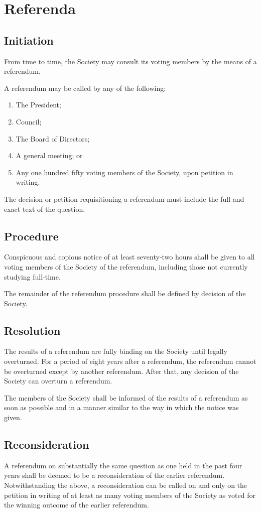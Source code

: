 \section{Referenda}
\subsection{Initiation}
From time to time, the Society may consult its voting members by the means of a
referendum.

A referendum may be called by any of the following:
\begin{enumerate}
  \item The President;
  \item Council;
  \item The Board of Directors;
  \item A general meeting; or
  \item Any one hundred fifty voting members of the Society, upon petition in
    writing.
\end{enumerate}

The decision or petition requisitioning a referendum must include the full and
exact text of the question.

\subsection{Procedure}
Conspicuous and copious notice of at least seventy-two hours shall be given to
all voting members of the Society of the referendum, including those not
currently studying full-time.

The remainder of the referendum procedure shall be defined by decision of the
Society.

\subsection{Resolution}
The results of a referendum are fully binding on the Society until legally
overturned. For a period of eight years after a referendum, the referendum
cannot be overturned except by another referendum. After that, any decision of
the Society can overturn a referendum.

The members of the Society shall be informed of the results of a referendum as
soon as possible and in a manner similar to the way in which the notice was
given.

\subsection{Reconsideration}
A referendum on substantially the same question as one held in the past four
years shall be deemed to be a reconsideration of the earlier referendum.
Notwithstanding the above, a reconsideration can be called on and only on the
petition in writing of at least as many voting members of the Society as voted
for the winning outcome of the earlier referendum.

